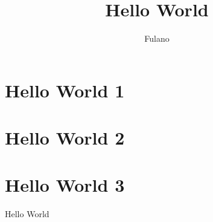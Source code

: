 \documentclass[A4paper, 12pt]{article}
\title{Hello World}
\author{Fulano}
\begin{document}
\maketitle
\tableofcontents


\section{Hello World 1} %


\section{Hello World 2} %


\section{Hello World 3} %



Hello World
\end{document}
